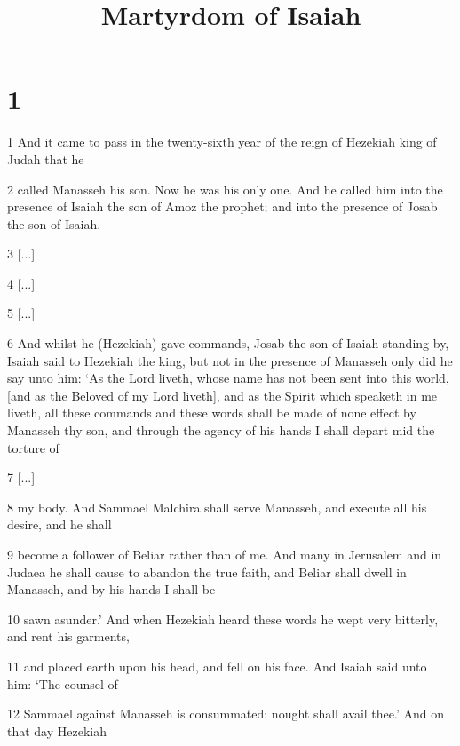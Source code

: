 

\title{Martyrdom of Isaiah}

\chapter{1}

\par 1 And it came to pass in the twenty-sixth year of the reign of Hezekiah king of Judah that he

\par 2 called Manasseh his son. Now he was his only one. And he called him into the presence of Isaiah the son of Amoz the prophet; and into the presence of Josab the son of Isaiah.

\par 3 [...]

\par 4 [...]

\par 5 [...]

\par 6 And whilst he (Hezekiah) gave commands, Josab the son of Isaiah standing by, Isaiah said to Hezekiah the king, but not in the presence of Manasseh only did he say unto him: ‘As the Lord liveth, whose name has not been sent into this world, [and as the Beloved of my Lord liveth], and as the Spirit which speaketh in me liveth, all these commands and these words shall be made of none effect by Manasseh thy son, and through the agency of his hands I shall depart mid the torture of

\par 7 [...]

\par 8 my body. And Sammael Malchira shall serve Manasseh, and execute all his desire, and he shall

\par 9 become a follower of Beliar rather than of me. And many in Jerusalem and in Judaea he shall cause to abandon the true faith, and Beliar shall dwell in Manasseh, and by his hands I shall be

\par 10 sawn asunder.’ And when Hezekiah heard these words he wept very bitterly, and rent his garments,

\par 11 and placed earth upon his head, and fell on his face. And Isaiah said unto him: ‘The counsel of

\par 12 Sammael against Manasseh is consummated: nought shall avail thee.’ And on that day Hezekiah

